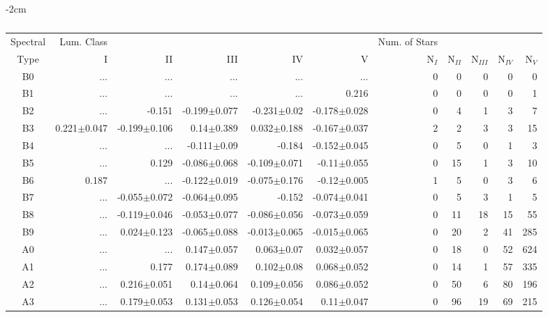 \begin{table}[t]
\tiny
\centering
\caption{\jwtwo}
\label{table:color_medians}
\begin{center}
    \addtolength{\leftskip} {-2cm}
    \addtolength{\rightskip}{-2cm}
    \begin{tabular}{c|rrrrr|rrrrr}
    \toprule
    Spectral & Lum. Class & & & & & Num. of Stars & & & &  \\
    Type & I & II & III &  IV & V & N$_{I}$ & N$_{II}$ & N$_{III}$ & N$_{IV}$ & N$_{V}$ \\ \midrule
      
    B0	&	 ...	&	 ...	&	 ...	&	 ...	&	 ...	&	0	&	0	&	0	&	0	&	0	\\
    B1	&	 ...	&	 ...	&	 ...	&	 ...	&	0.216	&	0	&	0	&	0	&	0	&	1	\\
    B2	&	 ...	&	-0.151	&	-0.199$\pm$0.077	&	-0.231$\pm$0.02	&	-0.178$\pm$0.028	&	0	&	4	&	1	&	3	&	7	\\
    B3	&	0.221$\pm$0.047	&	-0.199$\pm$0.106	&	0.14$\pm$0.389	&	0.032$\pm$0.188	&	-0.167$\pm$0.037	&	2	&	2	&	3	&	3	&	15	\\
    B4	&	 ...	&	 ...	&	-0.111$\pm$0.09	&	-0.184	&	-0.152$\pm$0.045	&	0	&	5	&	0	&	1	&	3	\\
    B5	&	 ...	&	0.129	&	-0.086$\pm$0.068	&	-0.109$\pm$0.071	&	-0.11$\pm$0.055	&	0	&	15	&	1	&	3	&	10	\\
    B6	&	0.187	&	 ...	&	-0.122$\pm$0.019	&	-0.075$\pm$0.176	&	-0.12$\pm$0.005	&	1	&	5	&	0	&	3	&	6	\\
    B7	&	 ...	&	-0.055$\pm$0.072	&	-0.064$\pm$0.095	&	-0.152	&	-0.074$\pm$0.041	&	0	&	5	&	3	&	1	&	5	\\
    B8	&	 ...	&	-0.119$\pm$0.046	&	-0.053$\pm$0.077	&	-0.086$\pm$0.056	&	-0.073$\pm$0.059	&	0	&	11	&	18	&	15	&	55	\\
    B9	&	 ...	&	0.024$\pm$0.123	&	-0.065$\pm$0.088	&	-0.013$\pm$0.065	&	-0.015$\pm$0.065	&	0	&	20	&	2	&	41	&	285	\\
    A0	&	 ...	&	 ...	&	0.147$\pm$0.057	&	0.063$\pm$0.07	&	0.032$\pm$0.057	&	0	&	18	&	0	&	52	&	624	\\
    A1	&	 ...	&	0.177	&	0.174$\pm$0.089	&	0.102$\pm$0.08	&	0.068$\pm$0.052	&	0	&	14	&	1	&	57	&	335	\\
    A2	&	 ...	&	0.216$\pm$0.051	&	0.14$\pm$0.064	&	0.109$\pm$0.056	&	0.086$\pm$0.052	&	0	&	50	&	6	&	80	&	196	\\
    A3	&	 ...	&	0.179$\pm$0.053	&	0.131$\pm$0.053	&	0.126$\pm$0.054	&	0.11$\pm$0.047	&	0	&	96	&	19	&	69	&	215	\\

\end{tabular}
\end{center}
\end{table}
